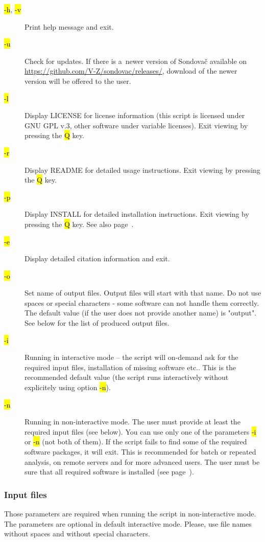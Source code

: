 \documentclass[a4paper, 11pt, twoside]{article}
\renewcommand{\texttt}[1]{\hl{\ttfamily #1}}
\begin{document}
\begin{description}
  \item[\texttt{-h}, \texttt{-v}] Print help message and exit.
  \item[\texttt{-u}] Check for updates. If there is a~newer version of Sondovač available on \url{https://github.com/V-Z/sondovac/releases/}, download of the newer version will be offered to the user.
  \item[\texttt{-l}] Display LICENSE for license information (this script is licensed under GNU GPL v.3, other software under variable licenses). Exit viewing by pressing the \texttt{Q} key.
  \item[\texttt{-r}] Display README for detailed usage instructions. Exit viewing by pressing the \texttt{Q} key.
  \item[\texttt{-p}] Display INSTALL for detailed installation instructions. Exit viewing by pressing the \texttt{Q} key. See also page~\pageref{install}.
  \item[\texttt{-e}] Display detailed citation information and exit.
  \item[\texttt{-o}] Set name of output files. Output files will start with that name. Do not use spaces or special characters - some software can not handle them correctly. The default value (if the user does not provide another name) is "output". See below for the list of produced output files.
  \item[\texttt{-i}] Running in interactive mode -- the script will on-demand ask for the required input files, installation of missing software etc.. This is the recommended default value (the script runs interactively without explicitely using option \texttt{-n}).
  \item[\texttt{-n}] Running in non-interactive mode. The user must provide at least the required input files (see below). You can use only one of the parameters \texttt{-i} or \texttt{-n} (not both of them). If the script fails to find some of the required software packages, it will exit. This is recommended for batch or repeated analysis, on remote servers and for more advanced users. The user must be sure that all required software is installed (see page~\pageref{install}).
\end{description}

\subsubsection{Input files}

Those parameters are required when running the script in non-interactive mode. The parameters are optional in default interactive mode. Please, use file names without spaces and without special characters.
\end{document}
